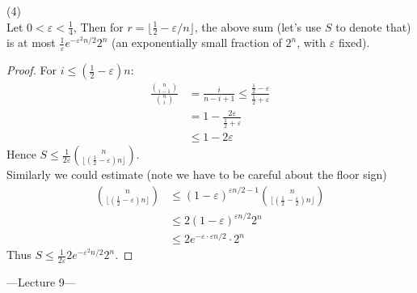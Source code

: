 \documentclass[a4paper]{article}
\begin{document}
\begin{prop} (4)\\
    Let $0 < \varepsilon < \frac{1}{4}$, Then for $r=\lfloor \frac{1}{2} -\varepsilon/n\rfloor$, the above sum (let's use $S$ to denote that) is at most $\frac{1}{\varepsilon} e^{-\varepsilon^2 n/2} 2^n$ (an exponentially small fraction of $2^n$, with $\varepsilon$ fixed).\\
    \begin{proof}
        For $i \leq (\frac{1}{2} - \varepsilon) n$:
        \begin{equation*}
            \begin{aligned}
                \frac{{n \choose {i-1}}}{{n \choose i}} &= \frac{i}{n-i+1} \leq \frac{\frac{1}{2}-\varepsilon}{\frac{1}{2}+\varepsilon}\\
                &= 1-\frac{2\varepsilon}{\frac{1}{2}+\varepsilon}\\
                &\leq 1-2\varepsilon
            \end{aligned}
        \end{equation*}
        Hence $S \leq \frac{1}{2\varepsilon}{n \choose {\lfloor (\frac{1}{2}-\varepsilon) n \rfloor}}$.\\
        Similarly we could estimate (note we have to be careful about the floor sign)
        \begin{equation*}
            \begin{aligned}
                {n \choose {\lfloor (\frac{1}{2}-\varepsilon) n \rfloor}} &\leq (1-\varepsilon)^{\varepsilon n/2-1} {n \choose {\lfloor (\frac{1}{2}-\frac{\varepsilon}{2}) n \rfloor}}\\
                &\leq 2(1-\varepsilon)^{\varepsilon n/2} 2^n\\
                &\leq 2 e^{-\varepsilon \cdot \varepsilon n/2} \cdot 2^n
            \end{aligned}
        \end{equation*}
        Thus $S \leq \frac{1}{2\varepsilon} 2e^{-\varepsilon^2 n/2} 2^n$.
    \end{proof}
\end{prop}

---Lecture 9---
\end{document}
